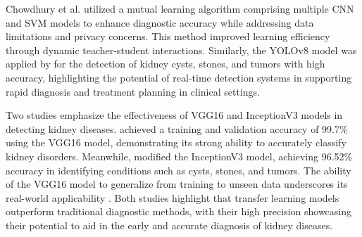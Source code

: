 Chowdhury et al. \cite{chowdhury2023mutual} utilized a mutual learning algorithm comprising multiple CNN and SVM models to enhance diagnostic accuracy while addressing data limitations and privacy concerns. This method improved learning efficiency through dynamic teacher-student interactions. Similarly, the YOLOv8 model was applied by \cite{pande2024multi} for the detection of kidney cysts, stones, and tumors with high accuracy, highlighting the potential of real-time detection systems in supporting rapid diagnosis and treatment planning in clinical settings.

Two studies emphasize the effectiveness of VGG16 and InceptionV3 models in detecting kidney diseases. \cite{prasher2024vgg16} achieved a training and validation accuracy of 99.7\% using the VGG16 model, demonstrating its strong ability to accurately classify kidney disorders. Meanwhile, \cite{anand2024transfer} modified the InceptionV3 model, achieving 96.52\% accuracy in identifying conditions such as cysts, stones, and tumors. The ability of the VGG16 model to generalize from training to unseen data underscores its real-world applicability \citep{prasher2024vgg16}. Both studies highlight that transfer learning models outperform traditional diagnostic methods, with their high precision showcasing their potential to aid in the early and accurate diagnosis of kidney diseases.

